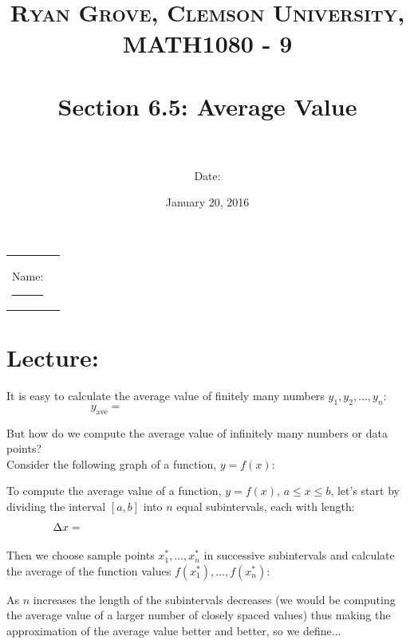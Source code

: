 \documentclass[paper=a4, fontsize=11pt]{scrartcl} %
\title{	
\normalfont \normalsize 
\textsc{Ryan Grove, Clemson University, MATH1080 - 9} \\ [25pt] %
\horrule{0.5pt} \\[0.4cm] %
\huge Section 6.5: Average Value \\ %
\horrule{2pt} \\[0.5cm] %
}
\author{Date:} %
\date{\normalsize January 20, 2016} %
\numberwithin{equation}{section} %
\numberwithin{figure}{section} %
\numberwithin{table}{section} %
\begin{document}
\maketitle %

\begin{flushleft}
\begin{tabular}{l l}
Name: \rule{3.2in}{.01cm}  & {}%
\end{tabular}
\end{flushleft}


\section*{\textbf{Lecture:}}


It is easy to calculate the average value of finitely many numbers $y_1,y_2,\ldots,y_n$:\\

\[y_{\text{ave}}=\hspace{3in}\]
\indent

But how do we compute the average value of infinitely many numbers or data points?\\
Consider the following graph of a function, $y=f(x)$:\\
\indent

\vspace{1.5in}


To compute the average value of a function, $y=f(x)$, $a\leq x \leq b$, let's start by dividing the interval $[a,b]$ into $n$ equal subintervals, each with length:\\

\[\Delta x = \hspace{3.5in}\]
\indent

Then we choose sample points $x_1^*,\ldots, x_n^*$ in successive subintervals and calculate the average of the function values $f(x_1^*),\ldots,f(x_n^*)$:\\


\vspace{2.4in}

As $n$ increases the length of the subintervals decreases (we would be computing the average value of a larger number of closely spaced values) thus making the approximation of the average value better and better, so we define...\\
\indent
\end{document}
